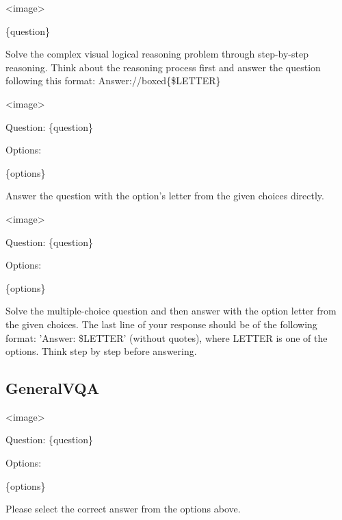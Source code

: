 \begin{tcolorbox}[
  title=VisuLogic,
  fonttitle=\bfseries,
  colframe=black,
  colback=white,
  toptitle=1mm,
  bottomtitle=1mm,
  top=2mm,
  verbatim,
]
<image>

\{question\}

Solve the complex visual logical reasoning problem through step-by-step reasoning. Think about the reasoning process first and answer the question following this format: Answer:{/}/boxed\{\$LETTER\}
\end{tcolorbox}

\begin{tcolorbox}[
  title=VisualPuzzles-Direct,
  fonttitle=\bfseries,
  colframe=black,
  colback=white,
  toptitle=1mm,
  bottomtitle=1mm,
  top=2mm,
  verbatim,
]
<image>

Question: \{question\}

Options:

\{options\}

Answer the question with the option's letter from the given choices directly.
\end{tcolorbox}

\begin{tcolorbox}[
  title=VisualPuzzles-CoT,
  fonttitle=\bfseries,
  colframe=black,
  colback=white,
  toptitle=1mm,
  bottomtitle=1mm,
  top=2mm,
  verbatim,
]
<image>

Question: \{question\}

Options:

\{options\}

Solve the multiple-choice question and then answer with the option letter from the given choices. The last line of your response should be of the following format: 'Answer: \$LETTER' (without quotes), where LETTER is one of the options. Think step by step before answering.
\end{tcolorbox}

\subsection{GeneralVQA}
\label{sec:vqa}

\begin{tcolorbox}[
  title={MMBench | RealWorldQA | MMStar},
  fonttitle=\bfseries,
  colframe=black,
  colback=white,
  toptitle=1mm,
  bottomtitle=1mm,
  top=2mm,
  verbatim,
]
<image>

Question: \{question\}

Options:

\{options\}

Please select the correct answer from the options above.
\end{tcolorbox}

